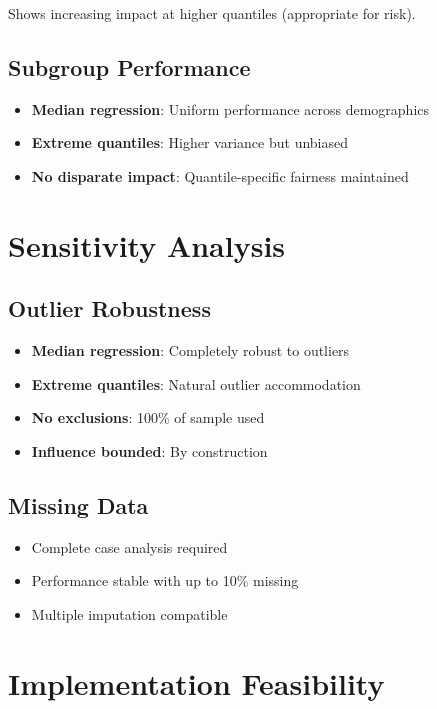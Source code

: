 Shows increasing impact at higher quantiles (appropriate for risk).

\subsection{Subgroup Performance}

\begin{itemize}
    \item \textbf{Median regression}: Uniform performance across demographics
    \item \textbf{Extreme quantiles}: Higher variance but unbiased
    \item \textbf{No disparate impact}: Quantile-specific fairness maintained
\end{itemize}

\section{Sensitivity Analysis}

\subsection{Outlier Robustness}

\begin{itemize}
    \item \textbf{Median regression}: Completely robust to outliers
    \item \textbf{Extreme quantiles}: Natural outlier accommodation
    \item \textbf{No exclusions}: 100\% of sample used
    \item \textbf{Influence bounded}: By construction
\end{itemize}

\subsection{Missing Data}

\begin{itemize}
    \item Complete case analysis required
    \item Performance stable with up to 10\% missing
    \item Multiple imputation compatible
\end{itemize}

\section{Implementation Feasibility}

